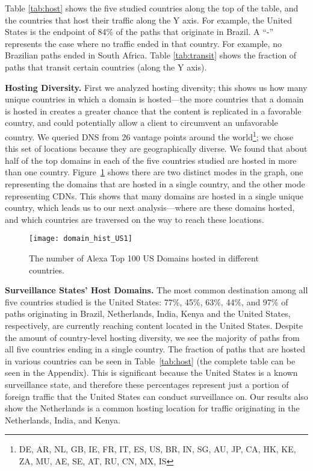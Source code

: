 Table \ref{tab:host} shows the five studied countries along the top of the table, and the countries that host their traffic along the Y axis.  For example, the United States is the endpoint of 84\% of the paths that originate in Brazil.  A ``-'' represents the case where no traffic ended in that country.  For example, no Brazilian paths ended in South Africa. Table \ref{tab:transit} shows the fraction of paths that transit certain countries (along the Y axis).

{\bf Hosting Diversity.}
First we analyzed hosting diversity; this shows us how many unique countries in which a domain is hosted---the more countries that a domain is hosted in creates a greater chance that the content is replicated in a favorable country, and could potentially allow a client to circumvent an unfavorable country.  We queried DNS from 26 vantage points around the world\footnote{DE, AR, NL, GB, IE, FR, IT, ES, US, BR, IN, SG, AU, JP, CA, HK, KE, ZA, MU, AE, SE, AT, RU, CN, MX, IS}; we chose this set of locations because they are geographically diverse.  We found that about half of the top domains in each of the five countries studied are hosted in more than one country.  Figure~\ref{fig:host_diversity} shows there are two distinct modes in the graph, one representing the domains that are hosted in a single country, and the other mode representing CDNs.  This shows that many domains are hosted in a single unique country, which leads us to our next analysis---where are these domains hosted, and which countries are traversed on the way to reach these locations.

\begin{figure}
\centering
\texttt{[image: domain\_hist\_US1]}
\caption{The number of Alexa Top 100 US Domains hosted in different countries.}
\label{fig:host_diversity}
\end{figure}

{\bf Surveillance States' Host Domains.}
The most common destination among all five countries studied is the United States: 77\%, 45\%, 63\%, 44\%, and 97\% of paths originating in Brazil, Netherlands, India, Kenya and the United States, respectively, are currently reaching content located in the United States. Despite the amount of country-level hosting diversity, we see the majority of paths from all five countries ending in a single country.  The fraction of paths that are hosted in various countries can be seen in Table~\ref{tab:host} (the complete table can be seen in the Appendix).  This is significant because the United States is a known surveillance state, and therefore these percentages represent just a portion of foreign traffic that the United States can conduct surveillance on.  Our results also show the Netherlands is a common hosting location for traffic originating in the Netherlands, India, and Kenya.

